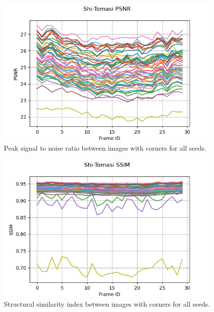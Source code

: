 \documentclass[11pt, conference, letterpaper]{IEEEtran}
\begin{document}
\begin{figure}[h]
    \centering
    \includegraphics[width=\linewidth]{mc_images/mc_stc_psnr.png}
    \caption{Peak signal to noise ratio between images with corners for all seeds.}
    \label{fig:mc_stc_psnr}
\end{figure}

\begin{figure}[h]
    \centering
    \includegraphics[width=\linewidth]{mc_images/mc_stc_ssim.png}
    \caption{Structural similarity index between images with corners for all seeds.}
    \label{fig:mc_stc_ssim}
\end{figure}
\end{document}
